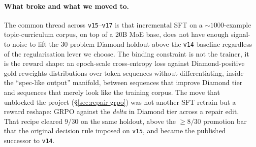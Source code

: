 \documentclass[11pt]{article}
\begin{document}
\paragraph{What broke and what we moved to.} The common thread across
\texttt{v15}--\texttt{v17} is that incremental SFT on a $\sim\!1000$-example
topic-curriculum corpus, on top of a $20$B MoE base, does not have
enough signal-to-noise to lift the $30$-problem Diamond holdout above
the \texttt{v14} baseline regardless of the regularisation lever we
choose. The binding constraint is not the trainer, it is the reward
shape: an epoch-scale cross-entropy loss against Diamond-positive
gold reweights distributions over token sequences without
differentiating, inside the ``spec-like output'' manifold, between
sequences that improve Diamond tier and sequences that merely look
like the training corpus. The move that unblocked the project
(\S\ref{sec:repair-grpo}) was not another SFT retrain but a reward
reshape: GRPO against the \emph{delta} in Diamond tier across a
repair edit. That recipe cleared $9/30$ on the same holdout, above
the $\ge 8/30$ promotion bar that the original decision rule
imposed on \texttt{v15}, and became the published successor to
\texttt{v14}.
\end{document}
